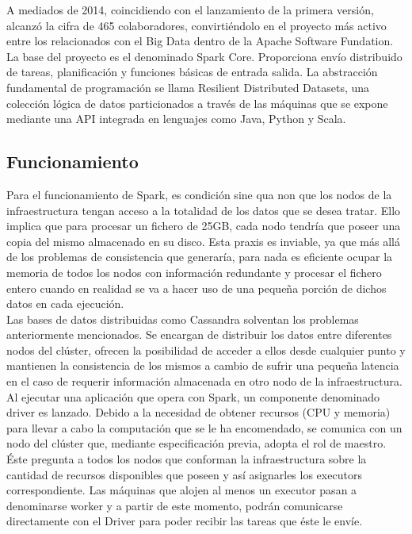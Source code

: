 A mediados de 2014, coincidiendo con el lanzamiento de la primera versión, alcanzó la cifra de 465 colaboradores, convirtiéndolo en el proyecto más activo entre los relacionados con el Big Data dentro de la Apache Software Fundation.\\

La base del proyecto es el denominado Spark Core. Proporciona envío distribuido de tareas, planificación y funciones básicas de entrada salida. La abstracción fundamental de programación se llama Resilient Distributed Datasets\cite{zaharia2012resilient}, una colección lógica de datos particionados a través de las máquinas que se expone mediante una API integrada en lenguajes como Java, Python y Scala.\\

\subsection{Funcionamiento}

Para el funcionamiento de Spark, es condición sine qua non que los nodos de la infraestructura tengan acceso a la totalidad de los datos que se desea tratar. Ello implica que para procesar un fichero de 25GB, cada nodo tendría que poseer una copia del mismo almacenado en su disco. Esta praxis es inviable, ya que más allá de los problemas de consistencia que generaría, para nada es eficiente ocupar la memoria de todos los nodos con información redundante y procesar el fichero entero cuando en realidad se va a hacer uso de una pequeña porción de dichos datos en cada ejecución.\\

Las bases de datos distribuidas como Cassandra solventan los problemas anteriormente mencionados. Se encargan de distribuir los datos entre diferentes nodos del clúster, ofrecen la posibilidad de acceder a ellos desde cualquier punto y mantienen la consistencia de los mismos a cambio de sufrir una pequeña latencia en el caso de requerir información almacenada en otro nodo de la infraestructura.\\ 

Al ejecutar una aplicación que opera con Spark, un componente denominado driver es lanzado. Debido a la necesidad de obtener recursos (CPU y memoria) para llevar a cabo la computación que se le ha encomendado, se comunica con un nodo del clúster que, mediante especificación previa, adopta el rol de maestro. Éste pregunta a todos los nodos que conforman la infraestructura sobre la cantidad de recursos disponibles que poseen y así asignarles los executors correspondiente. Las máquinas que alojen al menos un executor pasan a denominarse worker y a partir de este momento, podrán comunicarse directamente con el Driver para poder recibir las tareas que éste le envíe.\\

